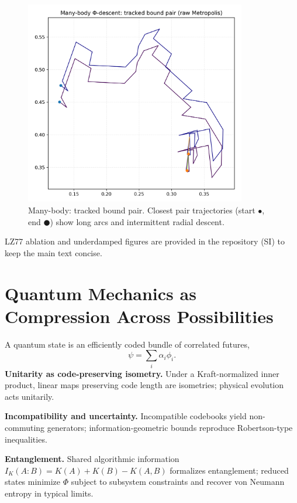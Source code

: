 \documentclass[aps,preprint,onecolumn,longbibliography,nofootinbib]{revtex4-2}
\numberwithin{equation}{section}        %
\begin{document}
\begin{figure}[H]
\centering
\includegraphics[width=0.86\textwidth]{orbit_many_body.png}
\caption{Many-body: tracked bound pair. Closest pair trajectories (start $\bullet$, end $\CIRCLE$) show long arcs and intermittent radial descent.}
\label{fig:manypair}
\end{figure}

\noindent LZ77 ablation and underdamped figures are provided in the repository (SI) to keep the main text concise.

\section{Quantum Mechanics as Compression Across Possibilities}
A quantum state is an efficiently coded bundle of correlated futures,
\begin{equation}
\psi=\sum_i \alpha_i \phi_i. \label{eq:super}
\end{equation}
\textbf{Unitarity as code-preserving isometry.} Under a Kraft-normalized inner product, linear maps preserving code length are isometries; physical evolution acts unitarily.

\textbf{Incompatibility and uncertainty.} Incompatible codebooks yield non-commuting generators; information-geometric bounds reproduce Robertson-type inequalities.

\textbf{Entanglement.} Shared algorithmic information $I_K(A\!:\!B)=K(A)+K(B)-K(A,B)$ formalizes entanglement; reduced states minimize $\Phi$ subject to subsystem constraints and recover von Neumann entropy in typical limits.
\end{document}

